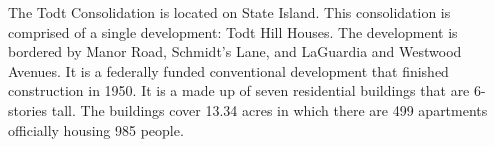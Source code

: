        

     

The Todt Consolidation is located on State Island. This consolidation is comprised of a single development: Todt Hill Houses. The development is bordered by Manor Road, Schmidt's Lane, and LaGuardia and Westwood Avenues. It is a federally funded conventional development that finished construction in 1950. It is a made up of seven residential buildings that are 6- stories tall. The buildings cover 13.34 acres in which there are 499 apartments officially housing 985 people.   

 

 